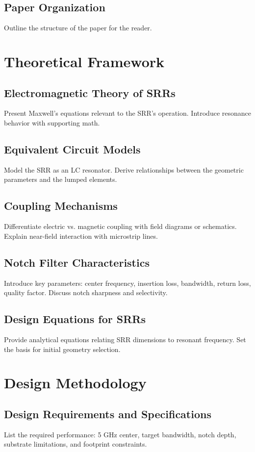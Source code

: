 \documentclass[conference]{IEEEtran}
\begin{document}
\subsection{Paper Organization}
Outline the structure of the paper for the reader.

\section{Theoretical Framework}

\subsection{Electromagnetic Theory of SRRs}
Present Maxwell’s equations relevant to the SRR’s operation. Introduce resonance behavior with supporting math.

\subsection{Equivalent Circuit Models}
Model the SRR as an LC resonator. Derive relationships between the geometric parameters and the lumped elements.

\subsection{Coupling Mechanisms}
Differentiate electric vs. magnetic coupling with field diagrams or schematics. Explain near-field interaction with microstrip lines.

\subsection{Notch Filter Characteristics}
Introduce key parameters: center frequency, insertion loss, bandwidth, return loss, quality factor. Discuss notch sharpness and selectivity.

\subsection{Design Equations for SRRs}
Provide analytical equations relating SRR dimensions to resonant frequency. Set the basis for initial geometry selection.

\section{Design Methodology}

\subsection{Design Requirements and Specifications}
List the required performance: 5 GHz center, target bandwidth, notch depth, substrate limitations, and footprint constraints.
\end{document}
